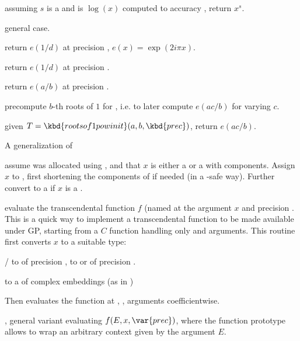  assuming $s$ is a
 and  is $\log(x)$ computed to accuracy
, return $x^s$.

 general case.

 return $e(1/d)$ at precision
, $e(x) = \exp(2i\pi x)$.

 return $e(1/d)$ at
precision .

 return $e(a/b)$ at
precision .

 precompute $b$-th
roots of $1$ for , i.e. to later compute $e(ac/b)$ for
varying $c$.

 given
$T = \kbd{rootsof1powinit}(a,b,\kbd{prec})$, return $e(ac/b)$.


\noindent A generalization of 

 assume  was allocated using
, and that $x$ is either a  or a 
with  components. Assign $x$ to , first shortening
the components of  if needed (in a -safe way). Further
convert  to a  if $x$ is a .

evaluate the transcendental function $f$ (named  at the argument
$x$ and precision . This is a quick way to implement a transcendental
function to be made available under GP, starting from a $C$ function
handling only  and  arguments. This routine first
converts $x$ to a suitable type:

\item {}/ to  of precision ,  to
 or  of precision .

\item {} to a  of complex embeddings (as in )

Then evaluates the function at , ,  arguments
coefficientwise.

, general variant evaluating $f(E, x, \var{prec})$, where the
function prototype allows to wrap an arbitrary context given by the argument
$E$.

